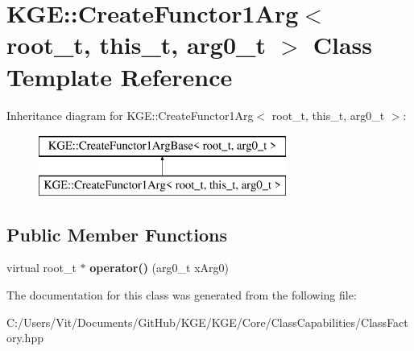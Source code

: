 \hypertarget{class_k_g_e_1_1_create_functor1_arg}{\section{K\-G\-E\-:\-:Create\-Functor1\-Arg$<$ root\-\_\-t, this\-\_\-t, arg0\-\_\-t $>$ Class Template Reference}
\label{class_k_g_e_1_1_create_functor1_arg}
}
Inheritance diagram for K\-G\-E\-:\-:Create\-Functor1\-Arg$<$ root\-\_\-t, this\-\_\-t, arg0\-\_\-t $>$\-:\begin{figure}[H]
\begin{center}
\leavevmode
\includegraphics[height=2.000000cm]{class_k_g_e_1_1_create_functor1_arg}
\end{center}
\end{figure}
\subsection*{Public Member Functions}
\begin{DoxyCompactItemize}
\item 
\hypertarget{class_k_g_e_1_1_create_functor1_arg_aabc7a3edb3f9d67cdeba51146686a4de}{virtual root\-\_\-t $\ast$ {\bfseries operator()} (arg0\-\_\-t x\-Arg0)}\label{class_k_g_e_1_1_create_functor1_arg_aabc7a3edb3f9d67cdeba51146686a4de}

\end{DoxyCompactItemize}


The documentation for this class was generated from the following file\-:\begin{DoxyCompactItemize}
\item 
C\-:/\-Users/\-Vit/\-Documents/\-Git\-Hub/\-K\-G\-E/\-K\-G\-E/\-Core/\-Class\-Capabilities/Class\-Factory.\-hpp\end{DoxyCompactItemize}
